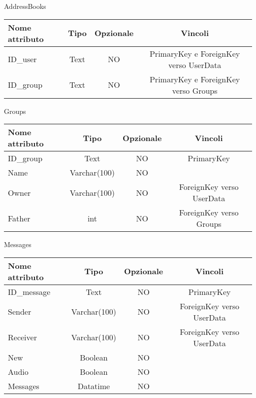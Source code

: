 \begin{center}
AddressBooks

\begin{center}
\begin{tabular}{lccc}
\toprule
Nome attributo & Tipo & Opzionale & Vincoli\\
\midrule %
ID\_user & Text & NO & PrimaryKey e ForeignKey verso UserData\\
ID\_group & Text & NO & PrimaryKey e ForeignKey verso Groups\\
\bottomrule
\end{tabular}
\end{center}

Groups

\begin{center}
\begin{tabular}{lccc}
\toprule
Nome attributo & Tipo & Opzionale & Vincoli\\
\midrule %
ID\_group & Text & NO & PrimaryKey\\
Name & Varchar(100) & NO & \\
Owner & Varchar(100) & NO & ForeignKey verso UserData\\
Father & int & NO & ForeignKey verso Groups\\
\bottomrule
\end{tabular}
\end{center}	

Messages

\begin{center}
\begin{tabular}{lccc}
\toprule
Nome attributo & Tipo & Opzionale & Vincoli\\
\midrule %
ID\_message & Text & NO & PrimaryKey\\
Sender & Varchar(100) & NO & ForeignKey verso UserData \\
Receiver & Varchar(100) & NO & ForeignKey verso UserData\\
New & Boolean & NO & \\
Audio & Boolean & NO & \\
Messages & Datatime & NO & \\
\bottomrule
\end{tabular}	
\end{center}

\end{center}

